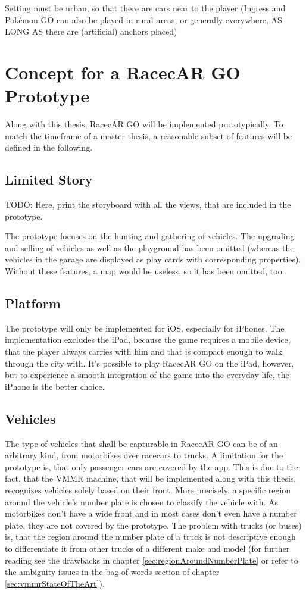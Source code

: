 Setting must be urban, so that there are cars near to the player (Ingress and Pok\'{e}mon GO can also be played in rural areas, or generally everywhere, AS LONG AS there are (artificial) anchors placed)


\section{Concept for a RacecAR GO Prototype}
Along with this thesis, RacecAR GO will be implemented prototypically. To match the timeframe of a master thesis, a reasonable subset of features will be defined in the following.

\subsection{Limited Story}
TODO: Here, print the storyboard with all the views, that are included in the prototype.

The prototype focuses on the hunting and gathering of vehicles. The upgrading and selling of vehicles as well as the playground has been omitted (whereas the vehicles in the garage are displayed as play cards with corresponding properties). Without these features, a map would be useless, so it has been omitted, too.

\subsection{Platform}
The prototype will only be implemented for iOS, especially for iPhones. The implementation excludes the iPad, because the game requires a mobile device, that the player always carries with him and that is compact enough to walk through the city with. It's possible to play RacecAR GO on the iPad, however, but to experience a smooth integration of the game into the everyday life, the iPhone is the better choice.

\subsection{Vehicles}
The type of vehicles that shall be capturable in RacecAR GO can be of an arbitrary kind, from motorbikes over racecars to trucks. A limitation for the prototype is, that only passenger cars are covered by the app. This is due to the fact, that the VMMR machine, that will be implemented along with this thesis, recognizes vehicles solely based on their front. More precisely, a specific region around the vehicle's number plate is chosen to classify the vehicle with. As motorbikes don't have a wide front and in most cases don't even have a number plate, they are not covered by the prototype. The problem with trucks (or buses) is, that the region around the number plate of a truck is not descriptive enough to differentiate it from other trucks of a different make and model (for further reading see the drawbacks in chapter \ref{sec:regionAroundNumberPlate} or refer to the ambiguity issues in the bag-of-words section of chapter \ref{sec:vmmrStateOfTheArt}).

